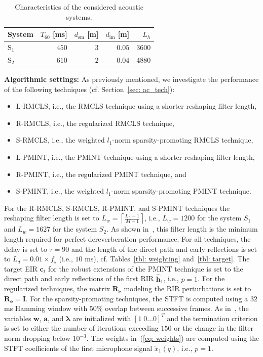 \documentclass[fleqn]{aes2e}
\begin{document}
\begin{table}[b!]
\small
\begin{center}
  \caption{Characteristics of the considered acoustic systems.}
  \label{tbl: ac_sys}
  \begin{tabularx}{\linewidth}{Xrrrr}
    \toprule
    System & $T_{60}$ [ms] & $d_{\text{sm}}$ [m] & $d_{\text{im}}$ [m] & $L_h$  \\
    \midrule
    $\text{S}_1$ & $450$ & $3$ & $0.05$ & $3600$ \\
    $\text{S}_2$ & $610$ & $2$ & $0.04$ & $4880$ \\
    \bottomrule
  \end{tabularx}
\end{center}
\end{table}
\textbf{Algorithmic settings:} \enspace
As previously mentioned, we investigate the performance of the following techniques (cf. Section~\ref{sec: ac_tech}):
\begin{itemize}
  \item L-RMCLS, i.e., the RMCLS technique using a shorter reshaping filter length,
  \item R-RMCLS, i.e., the regularized RMCLS technique,
  \item S-RMCLS, i.e., the weighted $l_1$-norm sparsity-promoting RMCLS technique,
  \item L-PMINT, i.e., the PMINT technique using a shorter reshaping filter length,
  \item R-PMINT, i.e., the regularized PMINT technique, and
  \item S-PMINT, i.e., the weighted $l_1$-norm sparsity-promoting PMINT technique. 
\end{itemize}
For the R-RMCLS, S-RMCLS, R-PMINT, and S-PMINT techniques the reshaping filter length is set to $L_w = \left\lceil{\frac{L_h-1}{M-1}}\right\rceil$, i.e., $L_w = 1200$ for the system $S_1$ and $L_w = 1627$ for the system $S_2$. 
As shown in~\cite{Miyoshi_ITASS_1988}, this filter length is the minimum length required for perfect dereverberation performance.
For all techniques, the delay is set to $\tau = 90$ and the length of the direct path and early reflections is set to $L_d = 0.01 \times f_s$ (i.e., $10$ ms), cf. Tables~\ref{tbl: weighting} and~\ref{tbl: target}.
The target EIR $\mathbf{c}_t$ for the robust extensions of the PMINT technique is set to the direct path and early reflections of the first RIR $\hat{\mathbf{h}}_1$, i.e., $p = 1$.
For the regularized techniques, the matrix $\mathbf{R}_{\mathbf{e}}$ modeling the RIR perturbations is set to $\mathbf{R}_{\mathbf{e}} = \mathbf{I}$.
For the sparsity-promoting techniques, the STFT is computed using a $32$ ms Hamming window with $50 \%$ overlap between successive frames. 
As in~\cite{Kodrasi_ICASSP_2016}, the variables $\mathbf{w}$, ${\mathbf{a}}$, and $\bm{\lambda}$ are initialized with $[1 \; 0 \ldots 0]^T$ and the termination criterion is set to either the number of iterations exceeding $150$ or the change in the filter norm dropping below $10^{-3}$.
The weights in~(\ref{eq: weights}) are computed using the STFT coefficients of the first microphone signal $\tilde{x}_1(q)$, i.e., $p = 1$.
\end{document}
